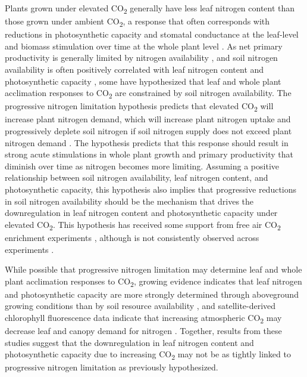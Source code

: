    Plants grown under elevated CO\textsubscript{2} generally have less leaf nitrogen content than those grown under ambient CO\textsubscript{2}, a response that often corresponds with reductions in photosynthetic capacity and stomatal conductance at the leaf-level and biomass stimulation over time at the whole plant level . As net primary productivity is generally limited by nitrogen availability , and soil nitrogen availability is often positively correlated with leaf nitrogen content and photosynthetic capacity , some have hypothesized that leaf and whole plant acclimation responses to CO\textsubscript{2} are constrained by soil nitrogen availability. The progressive nitrogen limitation hypothesis predicts that elevated CO\textsubscript{2} will increase plant nitrogen demand, which will increase plant nitrogen uptake and progressively deplete soil nitrogen if soil nitrogen supply does not exceed plant nitrogen demand . The hypothesis predicts that this response should result in strong acute stimulations in whole plant growth and primary productivity that diminish over time as nitrogen becomes more limiting. Assuming a positive relationship between soil nitrogen availability, leaf nitrogen content, and photosynthetic capacity, this hypothesis also implies that progressive reductions in soil nitrogen availability should be the mechanism that drives the downregulation in leaf nitrogen content and photosynthetic capacity under elevated CO\textsubscript{2}. This hypothesis has received some support from free air CO\textsubscript{2} enrichment experiments , although is not consistently observed across experiments .

    While possible that progressive nitrogen limitation may determine leaf and whole plant acclimation responses to CO\textsubscript{2}, growing evidence indicates that leaf nitrogen and photosynthetic capacity are more strongly determined through aboveground growing conditions than by soil resource availability , and satellite-derived chlorophyll fluorescence data indicate that increasing atmospheric CO\textsubscript{2} may decrease leaf and canopy demand for nitrogen . Together, results from these studies suggest that the downregulation in leaf nitrogen content and photosynthetic capacity due to increasing CO\textsubscript{2} may not be as tightly linked to progressive nitrogen limitation as previously hypothesized.

